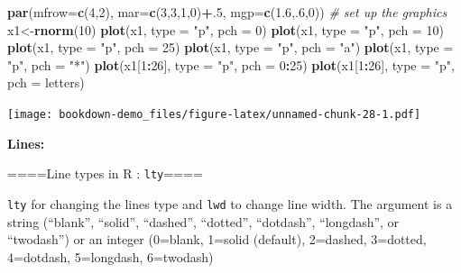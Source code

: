 \documentclass[]{book}
\newenvironment{Shaded}{\begin{snugshade}}{\end{snugshade}}
\newcommand{\KeywordTok}[1]{\textcolor[rgb]{0.13,0.29,0.53}{\textbf{#1}}}
\newcommand{\DataTypeTok}[1]{\textcolor[rgb]{0.13,0.29,0.53}{#1}}
\newcommand{\DecValTok}[1]{\textcolor[rgb]{0.00,0.00,0.81}{#1}}
\newcommand{\FloatTok}[1]{\textcolor[rgb]{0.00,0.00,0.81}{#1}}
\newcommand{\StringTok}[1]{\textcolor[rgb]{0.31,0.60,0.02}{#1}}
\newcommand{\CommentTok}[1]{\textcolor[rgb]{0.56,0.35,0.01}{\textit{#1}}}
\newcommand{\OperatorTok}[1]{\textcolor[rgb]{0.81,0.36,0.00}{\textbf{#1}}}
\newcommand{\NormalTok}[1]{#1}
\begin{document}
\begin{Shaded}
\begin{Highlighting}[]
\KeywordTok{par}\NormalTok{(}\DataTypeTok{mfrow=}\KeywordTok{c}\NormalTok{(}\DecValTok{4}\NormalTok{,}\DecValTok{2}\NormalTok{), }\DataTypeTok{mar=}\KeywordTok{c}\NormalTok{(}\DecValTok{3}\NormalTok{,}\DecValTok{3}\NormalTok{,}\DecValTok{1}\NormalTok{,}\DecValTok{0}\NormalTok{)}\OperatorTok{+}\NormalTok{.}\DecValTok{5}\NormalTok{, }\DataTypeTok{mgp=}\KeywordTok{c}\NormalTok{(}\FloatTok{1.6}\NormalTok{,.}\DecValTok{6}\NormalTok{,}\DecValTok{0}\NormalTok{))  }\CommentTok{# set up the graphics}
\NormalTok{x1<-}\KeywordTok{rnorm}\NormalTok{(}\DecValTok{10}\NormalTok{)}
\KeywordTok{plot}\NormalTok{(x1, }\DataTypeTok{type =} \StringTok{"p"}\NormalTok{, }\DataTypeTok{pch =} \DecValTok{0}\NormalTok{)}
\KeywordTok{plot}\NormalTok{(x1, }\DataTypeTok{type =} \StringTok{"p"}\NormalTok{, }\DataTypeTok{pch =} \DecValTok{10}\NormalTok{)}
\KeywordTok{plot}\NormalTok{(x1, }\DataTypeTok{type =} \StringTok{"p"}\NormalTok{, }\DataTypeTok{pch =} \DecValTok{25}\NormalTok{)}
\KeywordTok{plot}\NormalTok{(x1, }\DataTypeTok{type =} \StringTok{"p"}\NormalTok{, }\DataTypeTok{pch =} \StringTok{"a"}\NormalTok{)}
\KeywordTok{plot}\NormalTok{(x1, }\DataTypeTok{type =} \StringTok{"p"}\NormalTok{, }\DataTypeTok{pch =} \StringTok{"*"}\NormalTok{)}
\KeywordTok{plot}\NormalTok{(x1[}\DecValTok{1}\OperatorTok{:}\DecValTok{26}\NormalTok{], }\DataTypeTok{type =} \StringTok{"p"}\NormalTok{, }\DataTypeTok{pch =} \DecValTok{0}\OperatorTok{:}\DecValTok{25}\NormalTok{)}
\KeywordTok{plot}\NormalTok{(x1[}\DecValTok{1}\OperatorTok{:}\DecValTok{26}\NormalTok{], }\DataTypeTok{type =} \StringTok{"p"}\NormalTok{, }\DataTypeTok{pch =}\NormalTok{ letters)}
\end{Highlighting}
\end{Shaded}

\texttt{[image: bookdown-demo\_files/figure-latex/unnamed-chunk-28-1.pdf]}

\textbf{Lines: }

====Line types in R : \texttt{lty}====

\texttt{lty} for changing the lines type and \texttt{lwd} to change line
width. The argument is a string (``blank'', ``solid'', ``dashed'',
``dotted'', ``dotdash'', ``longdash'', or ``twodash'') or an integer
(0=blank, 1=solid (default), 2=dashed, 3=dotted, 4=dotdash, 5=longdash,
6=twodash)
\end{document}
